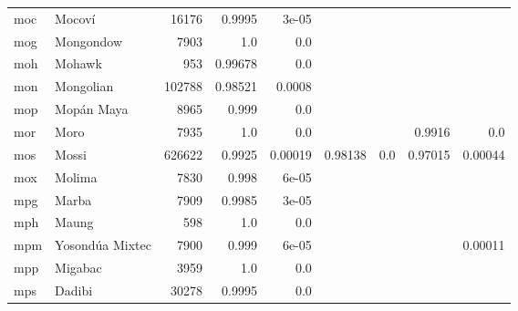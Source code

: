 \documentclass[11pt]{article}
\begin{document}
\begin{table*}[h]
{\begin{tabular}{llrrrrrrr}
moc         & Mocoví         & 16176         & 0.9995         & 3e-05         &          &          &          &          \\

mog         & Mongondow         & 7903         & 1.0         & 0.0         &          &          &          &          \\

moh         & Mohawk         & 953         & 0.99678         & 0.0         &          &          &          &          \\

mon         & Mongolian         & 102788         & 0.98521         & 0.0008         &          &          &          &          \\

mop         & Mopán Maya         & 8965         & 0.999         & 0.0         &          &          &          &          \\

mor         & Moro         & 7935         & 1.0         & 0.0         &          &          & 0.9916         & 0.0         \\

mos         & Mossi         & 626622         & 0.9925         & 0.00019         & 0.98138         & 0.0         & 0.97015         & 0.00044         \\

mox         & Molima         & 7830         & 0.998         & 6e-05         &          &          &          &          \\

mpg         & Marba         & 7909         & 0.9985         & 3e-05         &          &          &          &          \\

mph         & Maung         & 598         & 1.0         & 0.0         &          &          &          &          \\

mpm         & Yosondúa Mixtec         & 7900         & 0.999         & 6e-05         &          &          &          & 0.00011         \\

mpp         & Migabac         & 3959         & 1.0         & 0.0         &          &          &          &          \\

mps         & Dadibi         & 30278         & 0.9995         & 0.0         &          &          &          &          \\


\end{tabular}}
\end{table*}
\end{document}
